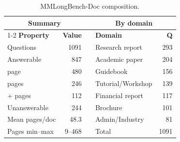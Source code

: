 %
%
%
\begin{table}[t]
\centering
\small
\setlength{\tabcolsep}{5pt}
\begin{tabular}{lrclr}
\toprule
\multicolumn{2}{c}{\textbf{Summary}} && \multicolumn{2}{c}{\textbf{By domain}} \\
\cmidrule{1-2}\cmidrule{4-5}
\textbf{Property} & \textbf{Value} && \textbf{Domain} & \textbf{Q} \\
\midrule
  Questions          & 1091   && Research report   & 293 \\
  \quad Answerable    & 847    && Academic paper    & 204 \\
  \quad\quad 1 page    & 480    && Guidebook         & 156 \\
  \quad\quad 2 pages   & 246    && Tutorial/Workshop & 139 \\
  \quad\quad 3+ pages  & 112    && Financial report  & 117 \\
  \quad Unanswerable  & 244    && Brochure          & 101 \\
  Mean pages/doc     & 48.3   && Admin/Industry    &  81 \\
  Pages min--max     & 9--468 && Total             & 1091 \\
\bottomrule
\end{tabular}
\caption{MMLongBench-Doc composition.}
\label{tab:mmlongbench}
\end{table}

